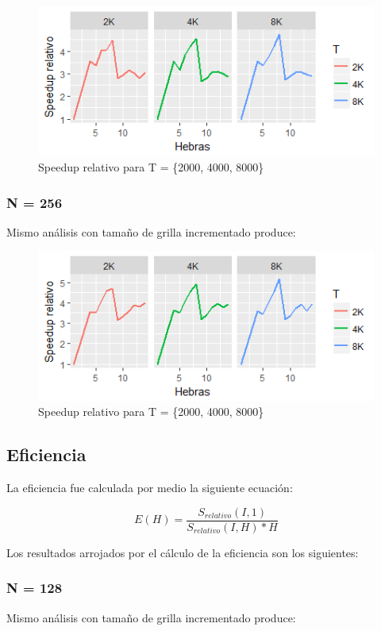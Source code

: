 \documentclass[jou]{apa6}
\begin{document}
\begin{figure}[h]
	\includegraphics[width=\columnwidth]{srel-128px.png}
	\caption{Speedup relativo para T = \{2000, 4000, 8000\}}
	\label{fig:Figure3}
\end{figure}

\subsubsection{N = 256}
Mismo análisis con tamaño de grilla incrementado produce:

\begin{figure}[h]
	\includegraphics[width=\columnwidth]{srel-256px.png}
	\caption{Speedup relativo para T = \{2000, 4000, 8000\}}
	\label{fig:Figure4}
\end{figure}

\FloatBarrier

\subsection{Eficiencia}
La eficiencia fue calculada por medio la siguiente ecuación:

\[
	E(H) = \frac{S_{relativo}(I, 1)}{S_{relativo}(I, H) * H}
\]

Los resultados arrojados por el cálculo de la eficiencia son los siguientes:

\subsubsection{N = 128}
Mismo análisis con tamaño de grilla incrementado produce:
\end{document}
